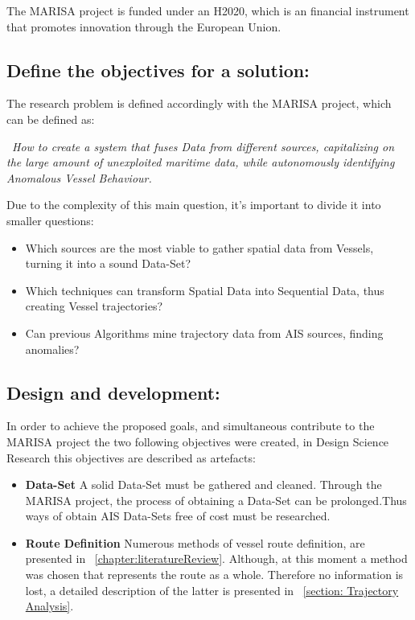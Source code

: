 The MARISA project is funded under an H2020, which is an financial instrument that promotes innovation through the European Union.

\subsection{Define the objectives for a solution:}
The research problem is defined accordingly with the MARISA project, which can be defined as: 

~\textit{How to create a system that fuses Data from different sources, capitalizing on the large amount of unexploited maritime data, while autonomously identifying Anomalous Vessel Behaviour.}  

Due to the complexity of this main question, it's important to divide it into smaller questions:

\begin{itemize}
\item Which sources are the most viable to gather spatial data from Vessels,
turning it into a sound Data-Set?
\item Which techniques can transform Spatial Data into Sequential Data, thus creating Vessel trajectories?
\item Can previous Algorithms mine trajectory data from AIS sources, finding anomalies?
\end{itemize}


\subsection{Design and development:} In order to achieve the proposed goals, and simultaneous contribute to the MARISA project the two following objectives were created, in Design Science Research this objectives are described as artefacts:

\begin{itemize}
\item \textbf{Data-Set} A solid Data-Set must be gathered and cleaned. Through the MARISA project, the process of obtaining a Data-Set can be prolonged.Thus ways of obtain AIS Data-Sets free of cost must be researched.

\item \textbf{Route Definition} Numerous methods of vessel route definition, are presented in ~\ref{chapter:literatureReview}.
Although, at this moment a method was chosen that represents the route as a whole. Therefore no information is lost, a detailed description of the latter is presented in ~\ref{section: Trajectory Analysis}.
\end{itemize}

